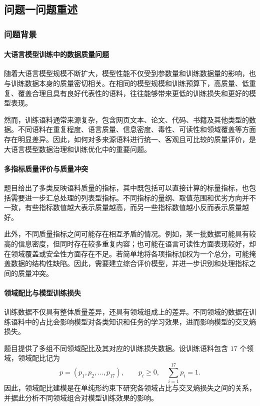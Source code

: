 
\subsection{问题一问题重述}
\label{sec:q1-restatement}

\subsubsection{问题背景}

\paragraph{大语言模型训练中的数据质量问题}
随着大语言模型规模不断扩大，模型性能不仅受到参数量和训练数据量的影响，也与训练数据本身的质量密切相关。在相同的模型规模和训练预算下，高质量、低重复、覆盖合理且具有良好代表性的语料，往往能够带来更低的训练损失和更好的模型表现。

然而，训练语料通常来源复杂，包含网页文本、论文、代码、书籍及其他类型的数据。不同语料在重复程度、语言质量、信息密度、毒性、可读性和领域覆盖等方面存在明显差异。因此，如何对多来源语料进行统一、客观且可比较的质量评价，是大语言模型数据治理和训练优化中的重要问题。

\paragraph{多指标质量评价与质量冲突}
题目给出了多类反映语料质量的指标，其中既包括可以直接计算的标量指标，也包括需要进一步汇总处理的列表型指标。不同指标的量纲、取值范围和优劣方向并不一致，有些指标数值越大表示质量越高，而另一些指标数值越小反而表示质量越好。

此外，不同质量指标之间可能存在相互矛盾的情况。例如，某一批数据可能具有较高的信息密度，但同时存在较多重复内容；也可能在语言可读性方面表现较好，却在领域覆盖或安全性方面存在不足。若简单地将各项指标加权为一个总分，可能掩盖数据的结构性缺陷。因此，需要建立综合评价模型，并进一步识别和处理指标之间的质量冲突。

\paragraph{领域配比与模型训练损失}
训练数据不仅具有整体质量差异，还具有领域组成上的差异。不同领域的数据在训练语料中的占比会影响模型对各类知识和任务的学习效果，进而影响模型的交叉熵损失。

题目提供了多组不同领域配比及其对应的训练损失数据。设训练语料包含 $17$ 个领域，领域配比记为
\begin{equation}
  p=(p_1,p_2,\ldots,p_{17}),
  \qquad p_i\geq 0,\quad \sum_{i=1}^{17}p_i=1.
  \label{eq:q1-restatement-simplex}
\end{equation}
因此，领域配比建模是在单纯形约束下研究各领域占比与交叉熵损失之间的关系，并据此分析不同领域组合对模型训练效果的影响。

